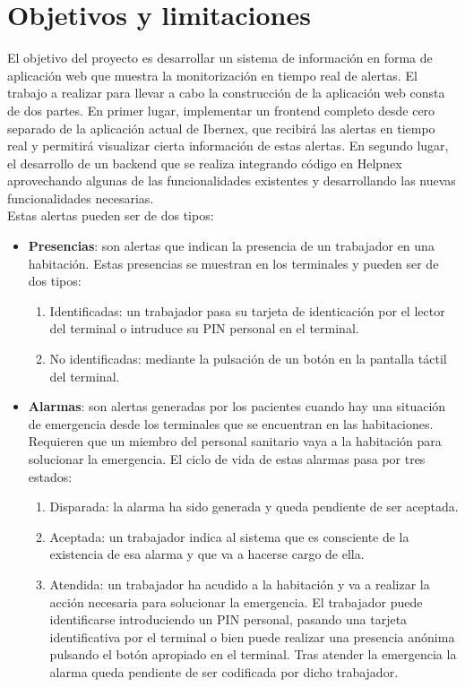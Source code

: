 \section{Objetivos y limitaciones}
\label{section-objetivos}
El objetivo del proyecto es desarrollar un sistema de información en forma de aplicación web que muestra la monitorización en tiempo real de alertas. El trabajo a realizar para llevar a cabo la construcción de la aplicación web consta de dos partes. En primer lugar, implementar un frontend completo desde cero separado de la aplicación actual de Ibernex, que recibirá las alertas en tiempo real y permitirá visualizar cierta información de estas alertas. En segundo lugar, el desarrollo de un backend que se realiza integrando código en Helpnex aprovechando algunas de las funcionalidades existentes y desarrollando las nuevas funcionalidades necesarias. \\

Estas alertas pueden ser de dos tipos:
\begin{itemize}
    \item \textbf{Presencias}: son alertas que indican la presencia de un trabajador en una habitación. Estas presencias se muestran en los terminales y pueden ser de dos tipos:
    \begin{enumerate}
        \item Identificadas: un trabajador pasa su tarjeta de identicación por el lector del terminal o intruduce su PIN personal en el terminal.
        \item No identificadas: mediante la pulsación de un botón en la pantalla táctil del terminal.
    \end{enumerate}
    \item \textbf{Alarmas}: son alertas generadas por los pacientes cuando hay una situación de
    emergencia desde los terminales que se encuentran en las habitaciones. Requieren que un miembro del personal sanitario vaya a la habitación para solucionar la emergencia.
    El ciclo de vida de estas alarmas pasa por tres estados:
    \begin{enumerate}
        \item Disparada: la alarma ha sido generada y queda pendiente de ser aceptada.
        \item Aceptada: un trabajador indica al sistema que es consciente de la existencia de esa alarma y que va a hacerse cargo de ella.
        \item Atendida: un trabajador ha acudido a la habitación y va a realizar la acción necesaria para solucionar la emergencia. El trabajador puede identificarse introduciendo un PIN personal, pasando una tarjeta identificativa por el terminal o bien puede realizar una presencia anónima pulsando el botón apropiado en el terminal. Tras atender la emergencia la alarma queda pendiente de ser codificada por dicho trabajador.
    \end{enumerate}    
\end{itemize}

